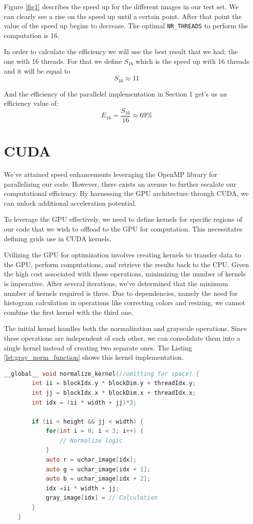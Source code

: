 \documentclass[sigconf]{acmart}
\begin{document}
Figure \ref{fig1} describes the speed up for the different images in our test set. We can clearly see a rise on the speed up until a certain point. After that point the value of the speed up begins to decrease. The optimal \texttt{NR\_THREADS} to perform the computation is 16.

In order to calculate the efficiency we will use the best result that we had: the one with 16 threads. For that we define $S_{16}$ which is the speed up with 16 threads and it will be equal to $$S_{16} \approx 11$$

And the efficiency of the parallelel implementation in Section 1 get's us an efficiency value of: $$E_{16} = \frac{S_{16}}{16} \approx 69\%$$

\section{CUDA}
We've attained speed enhancements leveraging the OpenMP library for parallelizing our code. However, there exists an avenue to further escalate our computational efficiency. By harnessing the GPU architecture through CUDA, we can unlock additional acceleration potential.

To leverage the GPU effectively, we need to define kernels for specific regions of our code that we wish to offload to the GPU for computation. This necessitates defining grids use in CUDA kernels.

Utilizing the GPU for optimization involves creating kernels to transfer data to the GPU, perform computations, and retrieve the results back to the CPU. Given the high cost associated with these operations, minimizing the number of kernels is imperative. After several iterations, we've determined that the minimum number of kernels required is three. Due to dependencies, namely the need for histogram calculation in operations like correcting colors and resizing, we cannot combine the first kernel with the third one.

The initial kernel handles both the normalization and grayscale operations. Since these operations are independent of each other, we can consolidate them into a single kernel instead of creating two separate ones. The Listing \ref{lst:gray_norm_function} shows this kernel implementation.

\begin{lstlisting}[language=C, caption=Grey Conversion and Normalization, label={lst:gray_norm_function}]
__global__ void normalize_kernel(//omitting for space) {
        int ii = blockIdx.y * blockDim.y + threadIdx.y;
        int jj = blockIdx.x * blockDim.x + threadIdx.x;
        int idx = (ii * width + jj)*3;

        if (ii < height && jj < width) {
            for(int i = 0; i < 3; i++) {
                // Normalize logic
            }
            auto r = uchar_image[idx];
            auto g = uchar_image[idx + 1];
            auto b = uchar_image[idx + 2];
            idx =ii * width + jj;
            gray_image[idx] = // Calculation
        }
    }
\end{lstlisting}
\end{document}
